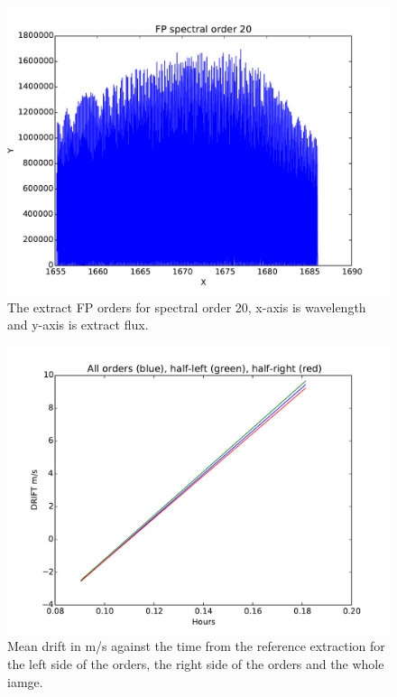 \begin{figure}
\begin{center}
\includegraphics[width=.8\textwidth]{figures/cal_DRIFT-PEAK_E2DS_spirou_1.pdf}
\caption{The extract FP orders for spectral order 20, x-axis is wavelength and y-axis is extract flux. \label{figure:cal_DRIFT-PEAK_E2DS_spirou_1}}
\end{center}
\end{figure}

\begin{figure}
\begin{center}
\includegraphics[width=.8\textwidth]{figures/cal_DRIFT-PEAK_E2DS_spirou_2.pdf}
\caption{Mean drift in m/s against the time from the reference extraction for the left side of the orders, the right side of the orders and the whole iamge. \label{figure:cal_DRIFT-PEAK_E2DS_spirou_2}}
\end{center}
\end{figure}
\clearpage
\newpage
